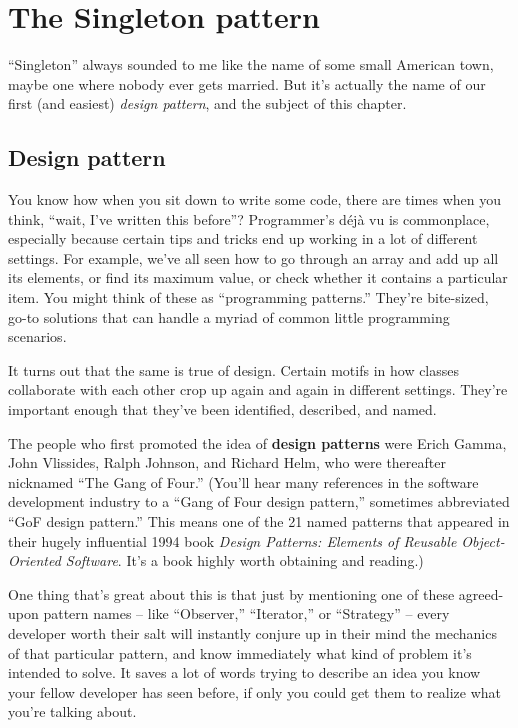 
\chapter{The Singleton pattern}

``Singleton'' always sounded to me like the name of some small American town,
maybe one where nobody ever gets married. But it's actually the name of our
first (and easiest) \textit{design pattern}, and the subject of this chapter.

\section{Design pattern}

You know how when you sit down to write some code, there are times when you
think, ``wait, I've written this before''? Programmer's d\'{e}j\`{a} vu is
commonplace, especially because certain tips and tricks end up working in a lot
of different settings. For example, we've all seen how to go through an array
and add up all its elements, or find its maximum value, or check whether it
contains a particular item. You might think of these as ``programming
patterns.'' They're bite-sized, go-to solutions that can handle a myriad of
common little programming scenarios.

It turns out that the same is true of design. Certain motifs in how classes
collaborate with each other crop up again and again in different settings.
They're important enough that they've been identified, described, and named.

The people who first promoted the idea of \textbf{design patterns} were Erich
Gamma, John Vlissides, Ralph Johnson, and Richard Helm, who were thereafter
nicknamed ``The Gang of Four.'' (You'll hear many references in the software
development industry to a ``Gang of Four design pattern,'' sometimes
abbreviated ``GoF design pattern.'' This means one of the 21 named patterns
that appeared in their hugely influential 1994 book \textit{Design Patterns:
Elements of Reusable Object-Oriented Software}. It's a book highly worth
obtaining and reading.)

One thing that's great about this is that just by mentioning one of these
agreed-upon pattern names -- like ``Observer,'' ``Iterator,'' or ``Strategy'' --
every developer worth their salt will instantly conjure up in their mind the
mechanics of that particular pattern, and know immediately what kind of
problem it's intended to solve. It saves a lot of words trying to describe an
idea you know your fellow developer has seen before, if only you could get
them to realize what you're talking about.

